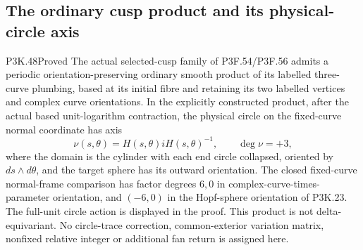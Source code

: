 \subsection{The ordinary cusp product and its physical-circle axis}
\begin{statement}{P3K.48}{Proved}
The actual selected-cusp family of P3F.54/P3F.56 admits a periodic
orientation-preserving ordinary smooth product of its labelled
three-curve plumbing, based at its initial fibre and retaining its
two labelled vertices and complex curve orientations.
In the explicitly constructed product, after the actual based
unit-logarithm contraction, the physical circle on the fixed-curve
normal coordinate has axis
\[
 \nu(s,\theta)=H(s,\theta)iH(s,\theta)^{-1},\qquad
 \deg\nu=+3,
\]
where the domain is the cylinder with each end circle collapsed,
oriented by \(ds\wedge d\theta\), and the target sphere has its
outward orientation. The closed fixed-curve normal-frame comparison has
factor degrees \(6,0\) in complex-curve-times-parameter orientation,
and \((-6,0)\) in the Hopf-sphere orientation of P3K.23.
The full-unit circle action is displayed in
the proof. This product is not delta-equivariant. No circle-trace
correction, common-exterior variation matrix, nonfixed relative
integer or additional fan return is assigned here.
\end{statement}
